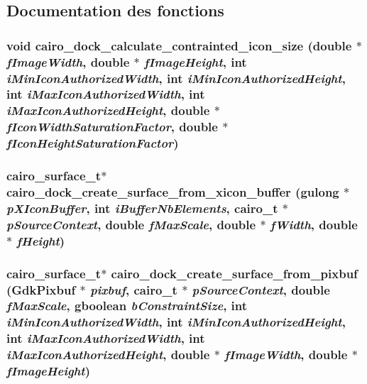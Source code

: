 \subsection{Documentation des fonctions}
\subsubsection{\setlength{\rightskip}{0pt plus 5cm}void cairo\_\-dock\_\-calculate\_\-contrainted\_\-icon\_\-size (double $\ast$ {\em f\-Image\-Width}, double $\ast$ {\em f\-Image\-Height}, int {\em i\-Min\-Icon\-Authorized\-Width}, int {\em i\-Min\-Icon\-Authorized\-Height}, int {\em i\-Max\-Icon\-Authorized\-Width}, int {\em i\-Max\-Icon\-Authorized\-Height}, double $\ast$ {\em f\-Icon\-Width\-Saturation\-Factor}, double $\ast$ {\em f\-Icon\-Height\-Saturation\-Factor})}\label{cairo-dock-surface-factory_8c_4c7687cc4b5a7ff06680a60d493193d9}


\subsubsection{\setlength{\rightskip}{0pt plus 5cm}cairo\_\-surface\_\-t$\ast$ cairo\_\-dock\_\-create\_\-surface\_\-from\_\-xicon\_\-buffer (gulong $\ast$ {\em p\-XIcon\-Buffer}, int {\em i\-Buffer\-Nb\-Elements}, cairo\_\-t $\ast$ {\em p\-Source\-Context}, double {\em f\-Max\-Scale}, double $\ast$ {\em f\-Width}, double $\ast$ {\em f\-Height})}\label{cairo-dock-surface-factory_8c_8b6a3e0b8a54450c1a667e558bfd7943}


\subsubsection{\setlength{\rightskip}{0pt plus 5cm}cairo\_\-surface\_\-t$\ast$ cairo\_\-dock\_\-create\_\-surface\_\-from\_\-pixbuf (Gdk\-Pixbuf $\ast$ {\em pixbuf}, cairo\_\-t $\ast$ {\em p\-Source\-Context}, double {\em f\-Max\-Scale}, gboolean {\em b\-Constraint\-Size}, int {\em i\-Min\-Icon\-Authorized\-Width}, int {\em i\-Min\-Icon\-Authorized\-Height}, int {\em i\-Max\-Icon\-Authorized\-Width}, int {\em i\-Max\-Icon\-Authorized\-Height}, double $\ast$ {\em f\-Image\-Width}, double $\ast$ {\em f\-Image\-Height})}\label{cairo-dock-surface-factory_8c_407975a48fc32a8ce923f215083b16f7}


